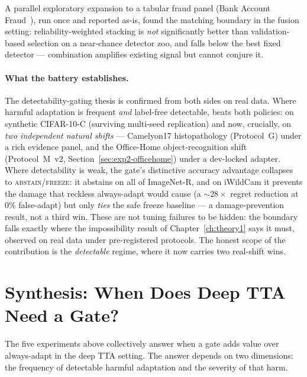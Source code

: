 \noindent A parallel exploratory expansion to a tabular fraud panel (Bank Account
Fraud~\cite{jesus2022baf}), run once and reported as-is, found the matching boundary
in the fusion setting: reliability-weighted stacking is \emph{not} significantly
better than validation-based selection on a near-chance detector zoo, and falls
below the best fixed detector --- combination amplifies existing signal but cannot
conjure it.

\paragraph{What the battery establishes.}
The detectability-gating thesis is confirmed from both sides on real data.  Where
harmful adaptation is frequent \emph{and} label-free detectable, \KGA{} beats both
policies: on synthetic CIFAR-10-C (surviving multi-seed replication) and now,
crucially, on \emph{two independent natural shifts} --- Camelyon17 histopathology
(Protocol~G) under a rich evidence panel, and the Office-Home object-recognition
shift (Protocol~M~v2, Section~\ref{sec:exp2-officehome}) under a dev-locked adapter.
Where detectability is weak, the gate's distinctive accuracy advantage collapses to
\textsc{abstain}/\textsc{freeze}: it abstains on all of ImageNet-R, and on iWildCam
it prevents the damage that reckless always-adapt would cause (a ${\sim}28{\times}$
regret reduction at $0\%$ false-adapt) but only \emph{ties} the safe freeze
baseline --- a damage-prevention result, not a third win.  These are not tuning
failures to be hidden: the boundary falls exactly where the impossibility result of
Chapter~\ref{ch:theory1} says it must, observed on real data under pre-registered
protocols.  The honest scope of the contribution is the \emph{detectable} regime,
where it now carries two real-shift wins.

\section{Synthesis: When Does Deep TTA Need a Gate?}\label{sec:exp2-synthesis}

The five experiments above collectively answer when a \KGA{} gate adds value over
always-adapt in the deep TTA setting.  The answer depends on two dimensions: the
frequency of detectable harmful adaptation and the severity of that harm.

